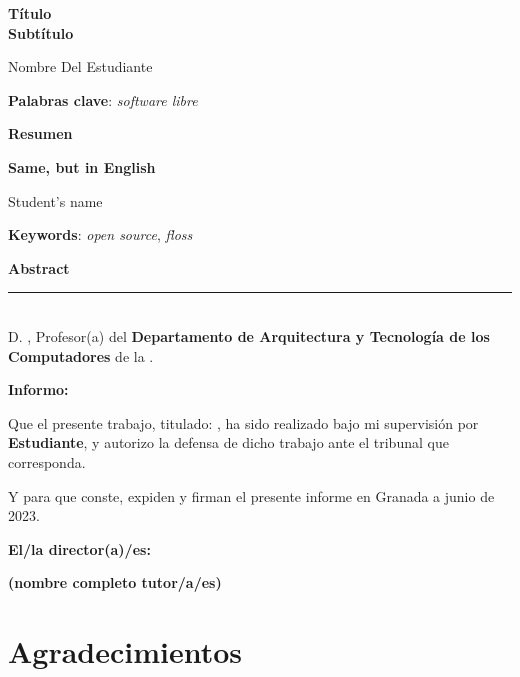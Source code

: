 \thispagestyle{empty}

\begin{center}
{\large\bfseries Título \\ Subtítulo }\\
\end{center}
\begin{center}
Nombre Del Estudiante\\
\end{center}


\vspace{0.5cm}
\noindent\textbf{Palabras clave}: \textit{software libre}
\vspace{0.7cm}

\noindent\textbf{Resumen}\\
	

\cleardoublepage

\begin{center}
	{\large\bfseries Same, but in English}\\
\end{center}
\begin{center}
	Student's name\\
\end{center}
\vspace{0.5cm}
\noindent\textbf{Keywords}: \textit{open source}, \textit{floss}
\vspace{0.7cm}

\noindent\textbf{Abstract}\


\cleardoublepage

\thispagestyle{empty}

\noindent\rule[-1ex]{\textwidth}{2pt}\\[4.5ex]

D. \textbf{\tutor}, Profesor(a) del \textbf{Departamento de Arquitectura y Tecnología de los Computadores} de la \textbf{\universidad}.

\vspace{0.5cm}

\textbf{Informo:}

\vspace{0.5cm}

Que el presente trabajo, titulado: \textit{\textbf{\titulo}},
ha sido realizado bajo mi supervisión por \textbf{Estudiante},
 y autorizo la defensa de dicho trabajo ante el tribunal que corresponda.

\vspace{0.5cm}

Y para que conste, expiden y firman el presente informe en Granada a junio de 2023.

\vspace{1cm}

\textbf{El/la director(a)/es: }

\vspace{5cm}

\noindent \textbf{(nombre completo tutor/a/es)}

\chapter*{Agradecimientos}




